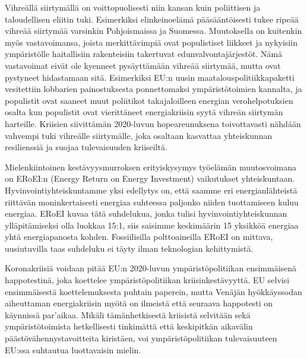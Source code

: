 \documentclass[nobib,finnish,oneside,openany,notoc,a4paper]{tufte-book}
\begin{document}
Vihreällä siirtymällä on voittopuolisesti niin kansan kuin poliittisen ja
taloudellisen eliitin tuki.  Esimerkiksi elinkeinoelämä pääsääntöisesti
tukee ripeää vihreää siirtymää varsinkin Pohjoismaissa ja Suomessa.
Muutoksella on kuitenkin myös vastavoimansa, joista merkittävimpiä ovat
populistiset liikkeet ja nykyisiin ympäristölle haitallisiin
rakenteisiin takertuvat edunvalvontajärjestöt. Nämä vastavoimat eivät
ole kyenneet pysäyttämään vihreää siirtymää, mutta ovat pystyneet
hidastamaan sitä.  Esimerkiksi EU:n uusin maatalouspolitiikkapaketti
vesitettiin lobbarien painostuksesta ponnettomaksi ympäristötoimien
kannalta, ja populistit ovat saaneet muut poliitikot takajaloilleen
energian verohelpotuksien osalta kun populistit ovat vierittäneet
energiakriisin syytä vihreän siirtymän harteille. Kriisien siivittämän
2020-luvun hopeareunuksena toivottavasti nähdään vahvempi tuki vihreälle
siirtymälle, joka osaltaan kasvattaa yhteiskunnan resilienssiä ja suojaa
tulevaisuuden kriiseiltä.

Mielenkiintoinen kestävyysmurroksen erityiskysymys työelämän
muutosvoimana on ERoEI:n (Energy Return on Energy Investment)
vaikutukset yhteiskuntaan. Hyvinvointiyhteiskuntamme yksi edellytys on,
että saamme eri energianlähteistä riittävän moninkertaisesti energiaa
suhteessa paljonko niiden tuottamiseen kuluu energiaa. ERoEI kuvaa tätä
suhdelukua, jonka tulisi hyvinvointiyhteiskunnan ylläpitämiseksi olla
luokkaa 15:1, siis saisimme keskimäärin 15 yksikköä energiaa yhtä
energiapanosta kohden. Fossiilisilla polttoaineilla ERoEI on mittava,
uusiutuvilla taas suhdeluku ei täyty ilman teknologian kehittymistä.

Koronakriisiä voidaan pitää EU:n 2020-luvun ympäristöpolitiikan
ensimmäisenä happotestinä, joka koettelee ympäristöpolitiikan
kriisinkestävyyttä. EU selvisi ensimmäisestä koettelemuksesta puhtain
paperein, mutta Venäjän hyökkäyssodan aiheuttaman energiakriisin myötä
on ilmeistä että seuraava happotesti on käynnissä par'aikaa. Mikäli
tämänhetkisestä kriisistä selvitään sekä ympäristötoimista hetkellisesti
tinkimättä että keskipitkän aikavälin päästövähennystavoitteita
kiristäen, voi ympäristöpolitiikan tulevaisuuteen EU:ssa suhtautua
luottavaisin mielin.
\end{document}
